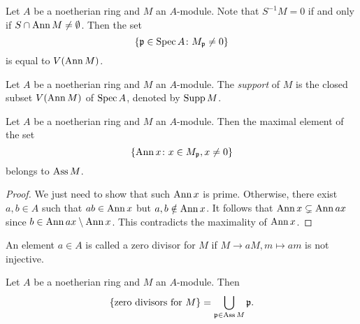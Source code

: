         Let $A$ be a noetherian ring and $M$ an $A$-module.
        Note that $S^{-1}M = 0$ if and only if $S \cap \operatorname{Ann} M \neq \emptyset$.
        Then the set 
        \[ \{ {\mathfrak{p}} \in \operatorname{Spec} A \colon M_{\mathfrak{p}} \neq 0 \} \]
        is equal to $V(\operatorname{Ann} M)$.
        
        \begin{definition}\label{def: support of a module}
            Let $A$ be a noetherian ring and $M$ an $A$-module.
            The \textit{support} of $M$ is the closed subset $V(\operatorname{Ann} M)$ of $\operatorname{Spec} A$, denoted by $\operatorname{Supp} M$.
        \end{definition}

        \begin{lemma}\label{lem: maximal Ann(x) is prime}
            Let $A$ be a noetherian ring and $M$ an $A$-module.
            Then the maximal element of the set 
            \[ \{ \operatorname{Ann} x \colon x \in M_{\mathfrak{p}}, x \neq 0 \} \]
            belongs to $\operatorname{Ass} M$.
        \end{lemma}
        \begin{proof}
            We just need to show that such $\operatorname{Ann} x$ is prime.
            Otherwise, there exist $a,b \in A$ such that $ab \in \operatorname{Ann} x$ but $a,b \notin \operatorname{Ann} x$.
            It follows that $\operatorname{Ann} x \subsetneq \operatorname{Ann} ax$ since $b \in \operatorname{Ann} ax \setminus \operatorname{Ann} x$.
            This contradicts the maximality of $\operatorname{Ann} x$.
        \end{proof}

        An element $a \in A$ is called a zero divisor for $M$ if $M \to aM, m\mapsto am$ is not injective.

        \begin{corollary}\label{cor: zero divisors and associated prime ideals}
            Let $A$ be a noetherian ring and $M$ an $A$-module.
            Then 
            \[ \{\text{zero divisors for } M \} = \bigcup_{{\mathfrak{p}} \in \operatorname{Ass} M} {\mathfrak{p}}. \]
        \end{corollary}

